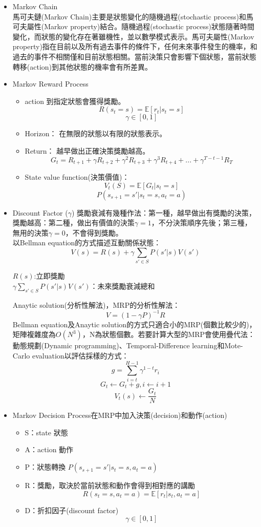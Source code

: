 \begin{itemize}
\item Markov Chain\\
 馬可夫鏈(Markov Chain)主要是狀態變化的隨機過程(stochastic process)和馬可夫屬性(Markov property)結合。隨機過程(stochastic process)狀態隨著時間變化，而狀態的變化存在著雖機性，並以數學模式表示。馬可夫屬性(Markov property)指在目前以及所有過去事件的條件下，任何未來事件發生的機率，和過去的事件不相關僅和目前狀態相關。當前決策只會影響下個狀態，當前狀態轉移(action)到其他狀態的機率會有所差異。\\
\item Markov Reward Process\\
\begin{itemize}
\item action 到指定狀態會獲得獎勵。
$$R(s_t=s) = \mathbb{E}[r_t|s_t = s]$$
$$\gamma \in [0, 1]$$
\item Horizon：
在無限的狀態以有限的狀態表示。
\item Return：
越早做出正確決策獎勵越高。
$$G_t = R_{t+1}+\gamma R_{t+2}+\gamma^2 R_{t+3}+\gamma^3 R_{t+4}+...+\gamma^{T-t-1} R_{T}$$
\item State value function(決策價值)：
$$V_t(S) = \mathbb{E}[G_t|s_t = s]$$
$$P(s_{s+1}=s'|s_t=s,a_t=a)$$
\end{itemize}
\item Discount Factor ($\gamma$)
獎勵衰減有幾種作法：第一種，越早做出有獎勵的決策，獎勵越高：第二種，做出有價值的決策$\gamma = 1$，不分決策順序先後；第三種，無用的決策$\gamma = 0$，不會得到獎勵。\\
以Bellman equation的方式描述互動關係狀態：\\
$$V(s) = R(s)+\gamma\sum_{s'\in S}P(s'|s)V(s')$$
\begin{center}
$R(s)$:立即獎勵\\
$\gamma\sum_{s'\in S}P(s'|s)V(s')$：未來獎勵衰減總和
\end{center}
Anaytic solution(分析性解法)，MRP的分析性解法：
$$V = (1-\gamma P)^{-1}R$$
Bellman equation及Anaytic solution的方式只適合小的MRP(個數比較少的)，矩陣複雜度為$O(N^3)$，N為狀態個數。若要計算大型的MRP會使用疊代法：動態規劃(Dynamic programming)、Temporal-Difference learning和Mote-Carlo evaluation以評估採樣的方式：
$$g = \sum_{i=t}^{H-1}\gamma^{1-t}r_i$$
$$G_t \leftarrow G_t+g,  i \leftarrow i+1$$
$$V_t(s) \leftarrow \frac{G_t}{N}$$
\item Markov Decision Process在MRP中加入決策(decision)和動作(action)
\begin{itemize}
\item S：state 狀態
\item A：action 動作
\item P：狀態轉換
$P(s_{s+1}=s'|s_t=s,a_t=a)$
\item R：獎勵，取決於當前狀態和動作會得到相對應的講勵
$$R(s_t=s, a_t=a) = \mathbb{E}[r_t|s_t, a_t=a]$$
\item D：折扣因子(discount factor)
$$\gamma \in [0,1]$$
\end{itemize}
\end{itemize}

